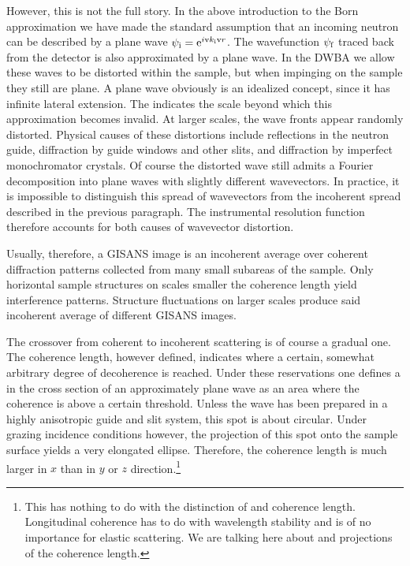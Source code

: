 However, this is not the full story.
In the above introduction to the Born approximation
we have made the standard assumption
that an incoming neutron can be described by a plane wave
$\psi_{\text{i}}=\text{e}^{i\text{v}{k}_{\text{i}}\text{v}{r}}$.
The wavefunction $\psi_{\text{f}}$ traced back from the detector is also
approximated by a plane wave.
In the DWBA we allow these waves to be distorted within the sample,
but when impinging on the sample they still are plane.
A plane wave obviously is an idealized concept,
since it has infinite lateral extension.
The  indicates the scale
beyond which this approximation becomes invalid.
At larger scales, the wave fronts appear randomly distorted.
Physical causes of these distortions include
reflections in the neutron guide,
diffraction by guide windows and other slits,
and diffraction by imperfect monochromator crystals.
Of course the distorted wave still admits a Fourier decomposition
into plane waves with slightly different wavevectors.
In practice, it is impossible to distinguish this spread of wavevectors
from the incoherent spread described in the previous paragraph.
The instrumental resolution function therefore
accounts for both causes of wavevector distortion.
%

Usually, therefore, a GISANS image is an incoherent average
over coherent diffraction patterns collected from 
many small subareas of the sample.
Only horizontal sample structures on scales smaller the coherence length
yield interference patterns.
Structure fluctuations on larger scales
produce said incoherent average of different GISANS images.

The crossover from coherent to incoherent scattering is of course
a gradual one.
The coherence length, however defined,
indicates where a certain, somewhat arbitrary degree
of decoherence is reached.
Under these reservations
one defines a 
in the cross section of an approximately plane wave
as an area where the coherence is above a certain threshold.
Unless the wave has been prepared in a highly anisotropic guide and slit system,
this spot is about circular.
Under grazing incidence conditions however,
the projection of this spot onto the sample surface
yields a very elongated ellipse.
Therefore, the coherence length is much larger in $x$ than
in $y$ or $z$ direction.\footnote
{This has nothing to do with the distinction of
   and  coherence length.
  Longitudinal coherence has to do with wavelength stability
  and is of no importance for elastic scattering.
  We are talking here about  and 
  projections of the  coherence length.}

